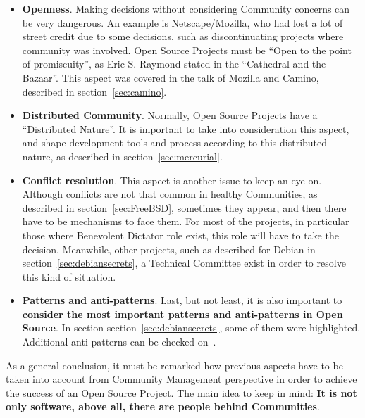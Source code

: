 \documentclass[11pt]{article}
\begin{document}
\begin{itemize}
\begin{itemize}
\item{\textbf{Openness}}. Making decisions without considering Community concerns can be very dangerous. An example is Netscape/Mozilla, who had lost a lot of street credit due to some decisions, such as discontinuating projects where community was involved. Open Source Projects must be ``Open to the point of promiscuity'', as Eric S. Raymond stated in the ``Cathedral and the Bazaar''. This aspect was covered in the talk of Mozilla and Camino, described in section~\ref{sec:camino}.
\item{\textbf{Distributed Community}}. Normally, Open Source Projects have a ``Distributed Nature''. It is important to take into consideration this aspect, and shape development tools and process according to this distributed nature, as described in section~\ref{sec:mercurial}.
\item{\textbf{Conflict resolution}}. This aspect is another issue to keep an eye on. Although conflicts are not that common in healthy Communities, as described in section~\ref{sec:FreeBSD}, sometimes they appear, and then there have to be mechanisms to face them. For most of the projects, in particular those where Benevolent Dictator role exist, this role will have to take the decision. Meanwhile, other projects, such as described for Debian in section~\ref{sec:debiansecrets}, a Technical Committee exist in order to resolve this kind of situation.
\item{\textbf{Patterns and anti-patterns}}. Last, but not least, it is also important to \textbf{consider the most important patterns and anti-patterns in Open Source}. In section section~\ref{sec:debiansecrets}, some of them were highlighted. Additional anti-patterns can be checked on~\cite{ANTI00}.
\end{itemize}
\end{itemize}
As a general conclusion, it must be remarked how previous aspects have to be taken into account from Community Management perspective in order to achieve the success of an Open Source Project. The main idea to keep in mind: \textbf{It is not only software, above all, there are people behind Communities}.

\pagebreak


{}
\end{document}
